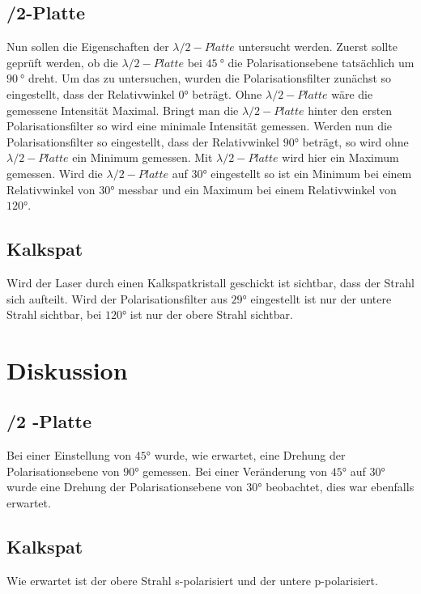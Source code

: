 \subsection{\lambda/2-Platte}
Nun sollen die Eigenschaften der $ \lambda /2 -Platte $ untersucht werden.
Zuerst sollte geprüft werden, ob die $ \lambda /2 -Platte $ bei $ \SI{45}{\degree} $ die Polarisationsebene tatsächlich um $ \SI{90}{\degree} $ dreht. Um das zu untersuchen, wurden die Polarisationsfilter zunächst so eingestellt, dass der Relativwinkel $ 0° $ beträgt. Ohne $ \lambda /2 -Platte $ wäre die gemessene Intensität Maximal. Bringt man die $ \lambda /2 -Platte $ hinter den ersten Polarisationsfilter so wird eine minimale Intensität gemessen. Werden nun die Polarisationsfilter so eingestellt, dass der Relativwinkel $ 90° $ beträgt, so wird ohne $ \lambda /2 -Platte $ ein Minimum gemessen. Mit $ \lambda /2 -Platte $ wird hier ein Maximum gemessen.
Wird die $ \lambda /2 -Platte $ auf $ 30° $ eingestellt so ist ein Minimum bei einem Relativwinkel von $ 30° $ messbar und ein Maximum bei einem Relativwinkel von $ 120° $.
\subsection{Kalkspat}
Wird der Laser durch einen Kalkspatkristall geschickt ist sichtbar, dass der Strahl sich aufteilt. Wird der Polarisationsfilter aus $ 29° $ eingestellt ist nur der untere Strahl sichtbar, bei $ 120° $ ist nur der obere Strahl sichtbar. 
\section{Diskussion}
\subsection{\lambda /2 -Platte}
Bei einer Einstellung von $ 45° $ wurde, wie erwartet, eine Drehung der Polarisationsebene von $ 90° $ gemessen.
Bei einer Veränderung von $ 45° $ auf $ 30° $ wurde eine Drehung der Polarisationsebene von $ 30° $ beobachtet, dies war ebenfalls erwartet.
\subsection{Kalkspat}
Wie erwartet ist der obere Strahl s-polarisiert und der untere p-polarisiert. 